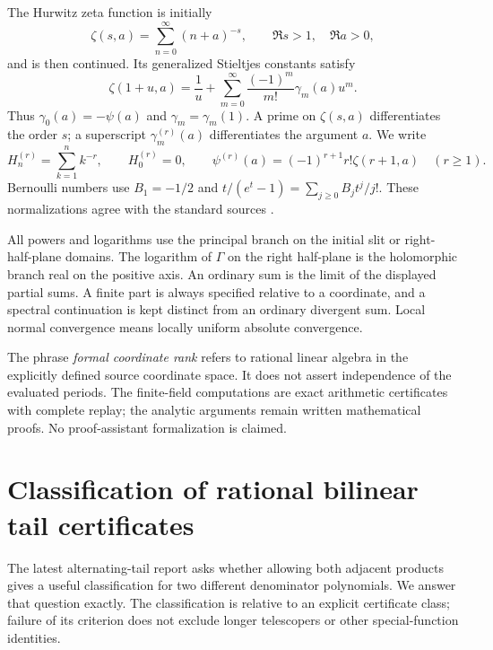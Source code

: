 \documentclass[11pt,letterpaper]{article}
\numberwithin{equation}{section}
\theoremstyle{definition}
\theoremstyle{remark}
\begin{document}
The Hurwitz zeta function is initially
\[
 \zeta(s,a)=\sum_{n=0}^{\infty}(n+a)^{-s},\qquad
 \Re s>1,\quad\Re a>0,
\]
and is then continued. Its generalized Stieltjes constants satisfy
\begin{equation}\label{eq:stieltjes-convention}
 \zeta(1+u,a)=\frac1u+
 \sum_{m=0}^{\infty}\frac{(-1)^m}{m!}\gamma_m(a)u^m.
\end{equation}
Thus $\gamma_0(a)=-\psi(a)$ and $\gamma_m=\gamma_m(1)$.
A prime on $\zeta(s,a)$ differentiates the order $s$; a superscript
$\gamma_m^{(r)}(a)$ differentiates the argument $a$. We write
\[
 H_n^{(r)}=\sum_{k=1}^n k^{-r},\qquad H_0^{(r)}=0,
 \qquad \psi^{(r)}(a)=(-1)^{r+1}r!\zeta(r+1,a)\quad(r\ge1).
\]
Bernoulli numbers use $B_1=-1/2$ and
$t/(e^t-1)=\sum_{j\ge0}B_jt^j/j!$.
These normalizations agree with the standard sources
\cite{DLMFZeta,DLMFPolygamma}.

All powers and logarithms use the principal branch on the initial slit
or right-half-plane domains. The logarithm of $\Gamma$ on the right
half-plane is the holomorphic branch real on the positive axis.
An ordinary sum is the limit of the displayed partial sums. A finite
part is always specified relative to a coordinate, and a spectral
continuation is kept distinct from an ordinary divergent sum.
Local normal convergence means locally uniform absolute convergence.

The phrase \emph{formal coordinate rank} refers to rational linear
algebra in the explicitly defined source coordinate space. It does not
assert independence of the evaluated periods. The finite-field
computations are exact arithmetic certificates with complete replay;
the analytic arguments remain written mathematical proofs. No
proof-assistant formalization is claimed.



\section{Classification of rational bilinear tail certificates}
\label{sec:bilinear}

The latest alternating-tail report asks whether allowing both adjacent
products gives a useful classification for two different denominator
polynomials. We answer that question exactly. The classification is
relative to an explicit certificate class; failure of its criterion
does not exclude longer telescopers or other special-function identities.
\end{document}
